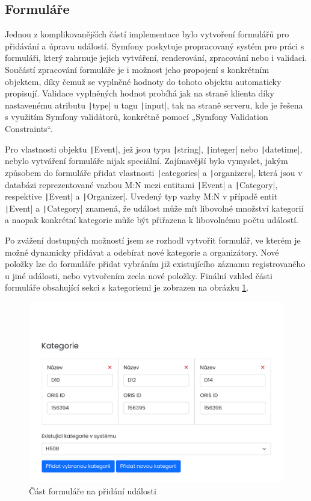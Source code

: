 \subsection{Formuláře}
Jednou z komplikovanějších částí implementace bylo vytvoření formulářů pro přidávání a úpravu událostí. Symfony poskytuje propracovaný systém pro práci s formuláři, který zahrnuje jejich vytváření, renderování, zpracování nebo i validaci. Součástí zpracování formuláře je i možnost jeho propojení s konkrétním objektem, díky čemuž se vyplněné hodnoty do tohoto objektu automaticky propisují. Validace vyplněných hodnot probíhá jak na straně klienta díky nastavenému atributu \texttt|type| u tagu \texttt|input|, tak na straně serveru, kde je řešena s využitím Symfony validátorů, konkrétně pomocí „Symfony Validation Constraints“.

Pro vlastnosti objektu \texttt|Event|, jež jsou typu \texttt|string|, \texttt|integer| nebo \texttt|datetime|, nebylo vytváření formuláře nijak speciální. Zajímavější bylo vymyslet, jakým způsobem do formuláře přidat vlastnosti \texttt|categories| a \texttt|organizers|, která jsou v databázi reprezentované vazbou M:N mezi entitami \texttt|Event| a \texttt|Category|, respektive \texttt|Event| a \texttt|Organizer|. Uvedený typ vazby M:N v případě entit \texttt|Event| a \texttt|Category| znamená, že událost může mít libovolné množství kategorií a naopak konkrétní kategorie může být přiřazena k libovolnému počtu událostí.

Po zvážení dostupných možností jsem se rozhodl vytvořit formulář, ve kterém je možné dynamicky přidávat a odebírat nové kategorie a organizátory. Nové položky lze do formuláře přidat vybráním již existujícího záznamu registrovaného u jiné události, nebo vytvořením zcela nové položky. Finální vzhled části formuláře obsahující sekci s kategoriemi je zobrazen na obrázku \ref{figure:form}.

\begin{figure}[h]
    \caption{Část formuláře na přidání události}
    \label{figure:form}
    \centering
    \includegraphics[width=0.95\linewidth]{images/form.pdf}
\end{figure}

